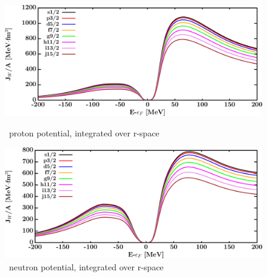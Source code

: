 \begin{figure}[H]
    \centering
    \begin{minipage}{0.45\textwidth}
        \centering
        \includegraphics[width=1.0\textwidth]{figures/sn124_protonVolumeIntegrals.png}
        \caption{\snFour\ proton potential, integrated over r-space}
        \label{DOMFitData_sn124_proton_potentialIntegral}
    \end{minipage}\hfill
    \begin{minipage}{0.45\textwidth}
        \centering
        \includegraphics[width=1.0\textwidth]{figures/sn124_neutronVolumeIntegrals.png}
        \caption{\snFour\ neutron potential, integrated over r-space}
        \label{DOMFitData_sn124_neutron_potentialIntegral}
    \end{minipage}
\end{figure}

\afterpage{\clearpage}

